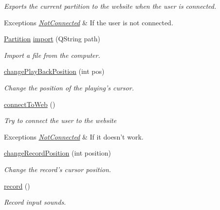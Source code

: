 \begin{DoxyCompactItemize}
\begin{DoxyCompactList}\small\item\em Exports the current partition to the website when the user is connected. 
\begin{DoxyExceptions}{Exceptions}
{\em \hyperlink{class_not_connected}{Not\-Connected}} & If the user is not connected. \\
\hline
\end{DoxyExceptions}
\end{DoxyCompactList}\item 
\hyperlink{class_partition}{Partition} \hyperlink{classno_skin_ac1381eda733850a3c92794d27a5abac5}{import} (Q\-String path)
\begin{DoxyCompactList}\small\item\em Import a file from the computer. \end{DoxyCompactList}\item 
\hyperlink{classno_skin_a4fed1dbb2bdcd0971a14200d935499bb}{change\-Play\-Back\-Position} (int pos)
\begin{DoxyCompactList}\small\item\em Change the position of the playing's cursor. \end{DoxyCompactList}\item 
\hypertarget{classno_skin_ad803c41ff02ecf863ef1a674f31dc15a}{\hyperlink{classno_skin_ad803c41ff02ecf863ef1a674f31dc15a}{connect\-To\-Web} ()}\label{classno_skin_ad803c41ff02ecf863ef1a674f31dc15a}

\begin{DoxyCompactList}\small\item\em Try to connect the user to the website 
\begin{DoxyExceptions}{Exceptions}
{\em \hyperlink{class_not_connected}{Not\-Connected}} & If it doesn't work. \\
\hline
\end{DoxyExceptions}
\end{DoxyCompactList}\item 
\hyperlink{classno_skin_a5051afe8c6bd3fe788bb0f94b1f64a97}{change\-Record\-Position} (int position)
\begin{DoxyCompactList}\small\item\em Change the record's cursor position. \end{DoxyCompactList}\item 
\hypertarget{classno_skin_a26d11b5aaca844c5c70541bb08cf808b}{\hyperlink{classno_skin_a26d11b5aaca844c5c70541bb08cf808b}{record} ()}\label{classno_skin_a26d11b5aaca844c5c70541bb08cf808b}

\begin{DoxyCompactList}\small\item\em Record input sounds. \end{DoxyCompactList}\end{DoxyCompactItemize}


